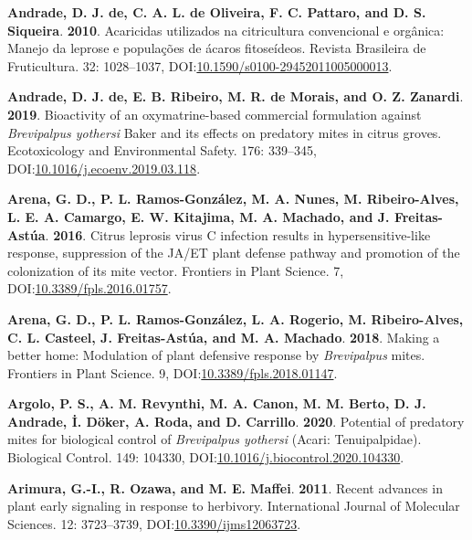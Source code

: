 \documentclass[12pt,final,CPage]{ufthesis}
\newlength{\cslhangindent}
\newenvironment{CSLReferences}[2] %
{%
	\setlength{\parindent}{0pt}
	\ifodd #1 \everypar{\setlength{\hangindent}{\cslhangindent}}\ignorespaces\fi
	\ifnum #2 > 0
	\setlength{\parskip}{#2\baselineskip}
	\fi
}%
{}
\begin{document}
{\begin{CSLReferences}{1}{0}
  \leavevmode{}%
  \textbf{Andrade, D. J. de, C. A. L. de Oliveira, F. C. Pattaro, and D. S. Siqueira}. \textbf{2010}. Acaricidas utilizados na citricultura convencional e org{â}nica: Manejo da leprose e popula{ç}{õ}es de {á}caros fitose{í}deos. Revista Brasileira de Fruticultura. 32: 1028--1037, DOI:\href{https://doi.org/10.1590/s0100-29452011005000013}{10.1590/s0100-29452011005000013}.

  \leavevmode{}%
  \textbf{Andrade, D. J. de, E. B. Ribeiro, M. R. de Morais, and O. Z. Zanardi}. \textbf{2019}. Bioactivity of an oxymatrine-based commercial formulation against {\emph{Brevipalpus yothersi}} {Baker} and its effects on predatory mites in citrus groves. Ecotoxicology and Environmental Safety. 176: 339--345, DOI:\href{https://doi.org/10.1016/j.ecoenv.2019.03.118}{10.1016/j.ecoenv.2019.03.118}.

  \leavevmode{}%
  \textbf{Arena, G. D., P. L. Ramos-González, M. A. Nunes, M. Ribeiro-Alves, L. E. A. Camargo, E. W. Kitajima, M. A. Machado, and J. Freitas-Astúa}. \textbf{2016}. {Citrus leprosis virus} {C} infection results in hypersensitive-like response, suppression of the {JA}/{ET} plant defense pathway and promotion of the colonization of its mite vector. Frontiers in Plant Science. 7, DOI:\href{https://doi.org/10.3389/fpls.2016.01757}{10.3389/fpls.2016.01757}.

  \leavevmode{}%
  \textbf{Arena, G. D., P. L. Ramos-González, L. A. Rogerio, M. Ribeiro-Alves, C. L. Casteel, J. Freitas-Astúa, and M. A. Machado}. \textbf{2018}. Making a better home: Modulation of plant defensive response by {\emph{Brevipalpus}} mites. Frontiers in Plant Science. 9, DOI:\href{https://doi.org/10.3389/fpls.2018.01147}{10.3389/fpls.2018.01147}.

  \leavevmode{}%
  \textbf{Argolo, P. S., A. M. Revynthi, M. A. Canon, M. M. Berto, D. J. Andrade, İ. Döker, A. Roda, and D. Carrillo}. \textbf{2020}. Potential of predatory mites for biological control of {\emph{Brevipalpus yothersi}} ({Acari}: {Tenuipalpidae}). Biological Control. 149: 104330, DOI:\href{https://doi.org/10.1016/j.biocontrol.2020.104330}{10.1016/j.biocontrol.2020.104330}.

  \leavevmode{}%
  \textbf{Arimura, G.-I., R. Ozawa, and M. E. Maffei}. \textbf{2011}. Recent advances in plant early signaling in response to herbivory. International Journal of Molecular Sciences. 12: 3723--3739, DOI:\href{https://doi.org/10.3390/ijms12063723}{10.3390/ijms12063723}.


\end{CSLReferences}}
\end{document}
